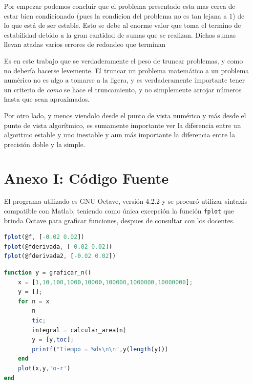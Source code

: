 \documentclass[11pt,a4paper]{article}
\begin{document}
Por empezar podemos concluir que el problema presentado esta mas cerca de estar bien condicionado (pues la condicion del problema no es tan lejana a 1) de lo que está de ser estable. Esto se debe al enorme valor que toma el termino de estabilidad debido a la gran cantidad de sumas que se realizan. Dichas sumas llevan atadas varios errores de redondeo que terminan 

Es en este trabajo que se verdaderamente el peso de truncar problemas, y como no debería hacerse levemente. El truncar un problema matemático a un problema numérico no es algo a tomarse a la ligera, y es verdaderamente importante tener un criterio de \textit{como} se hace el truncamiento, y no simplemente arrojar números hasta que sean aproximados. 

Por otro lado, y menos viendolo desde el punto de vista numérico y más desde el punto de vista algorítmico,  es sumamente importante ver la diferencia entre un algoritmo estable y uno inestable y aun más importante la diferencia entre la precisión doble y la simple.

\newpage
\appendix
\section{Anexo I: Código Fuente}

El programa utilizado es GNU Octave, versión 4.2.2 y se procuró utilizar sintaxis compatible con Matlab, teniendo como única excepción la función \texttt{fplot} que brinda Octave para graficar funciones, despues de consultar con los docentes.



\newpage


\newpage


\newpage
\begin{lstlisting}[language=Octave,title=Generación de graficos]
fplot(@f, [-0.02 0.02])
fplot(@fderivada, [-0.02 0.02])
fplot(@fderivada2, [-0.02 0.02])
\end{lstlisting}

\begin{lstlisting}[language=Octave,title=Truncamiento y gráfico de n]
function y = graficar_n()
    x = [1,10,100,1000,10000,100000,1000000,10000000];
    y = [];
    for n = x
        n
        tic;
        integral = calcular_area(n)
        y = [y,toc]; 
        printf("Tiempo = %ds\n\n",y(length(y)))   
    end
    plot(x,y,'o-r')
end
\end{lstlisting}
\end{document}
